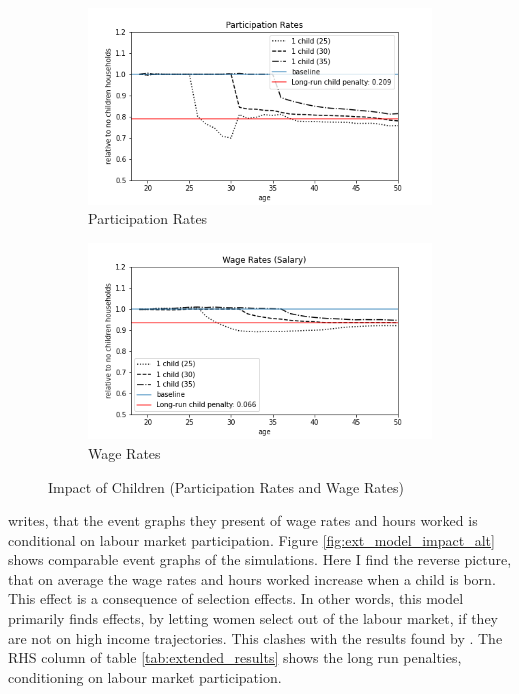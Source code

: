\begin{figure}[ht]
\begin{subfigure}{.5\textwidth}
  \centering
  \includegraphics[width=1\linewidth]{figures/extended_model_event_participation_rates.png}
  \caption{Participation Rates}
  \label{fig:ext_model_event_partipation}
\end{subfigure}%
\begin{subfigure}{.5\textwidth}
  \centering
  \includegraphics[width=1\linewidth]{figures/extended_model_event_wage_rates.png}
  \caption{Wage Rates}
  \label{fig:ext_model_event_wage_rates}
\end{subfigure}
    \caption{Impact of Children (Participation Rates and Wage Rates)}
    \label{fig:ext_model_impact_participation_wage}
\end{figure}


\textcite{kleven_children_2019} writes, that the event graphs they present of wage rates and hours worked is conditional on labour market participation. Figure \ref{fig:ext_model_impact_alt} shows comparable event graphs of the simulations. Here I find the reverse picture, that on average the wage rates and hours worked increase when a child is born. This effect is a consequence of selection effects. In other words, this model primarily finds effects, by letting women select out of the labour market, if they are not on high income trajectories. This clashes with the results found by \textcite{kleven_children_2019}. The RHS column of table \ref{tab:extended_results} shows the long run penalties, conditioning on labour market participation.


